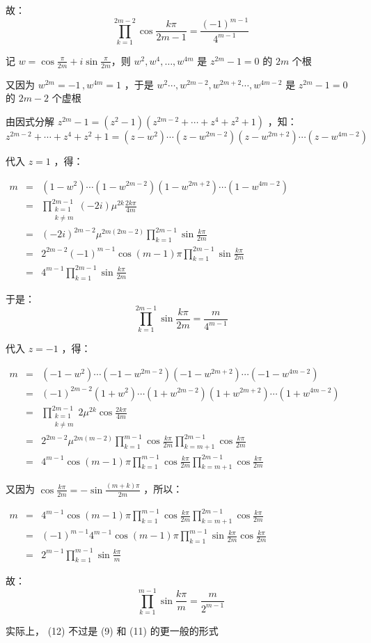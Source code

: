 故： \begin{equation}
\prod_{k=1}^{2m-2}\cos\frac{k\pi}{2m-1}=\frac{(-1)^{m-1}}{4^{m-1}}\tag{10} 
\end{equation}

记 $\displaystyle{w=\cos\frac{\pi}{2m}+i\sin\frac{\pi}{2m}}$，则 $w^2,w^4,\dots ,w^{4m}$ 是 $z^{2m}-1=0$ 的 $2m$ 个根

又因为 $w^{2m}=-1\,,w^{4m}=1$ ，于是 $w^2\cdots,w^{2m-2},w^{2m+2}\cdots,w^{4m-2}$ 是 $z^{2m}-1=0$ 的 $2m-2$ 个虚根

由因式分解 $z^{2m}-1=(z^2-1)(z^{2m-2}+\cdots+z^4+z^2+1)$ ，知：
$$z^{2m-2}+\cdots+z^4+z^2+1=(z-w^2)\cdots(z-w^{2m-2})(z-w^{2m+2})\cdots(z-w^{4m-2})$$

代入 $z=1$ ，得：

$\begin{eqnarray*} m&=&(1-w^2)\cdots(1-w^{2m-2})(1-w^{2m+2})\cdots(1-w^{4m-2})\\ &=&\prod_{\substack{k=1\\k\neq m}}^{2m-1}(-2i)\mu^{2k}\frac{2k\pi}{4m}\\ &=&(-2i)^{2m-2}\mu^{2m(2m-2)}\prod_{k=1}^{2m-1}\sin\frac{k\pi}{2m}\\ &=&2^{2m-2}(-1)^{m-1}\cos(m-1)\pi\prod_{k=1}^{2m-1}\sin\frac{k\pi}{2m}\\ &=&4^{m-1}\prod_{k=1}^{2m-1}\sin\frac{k\pi}{2m} \end{eqnarray*}$

于是： \begin{equation}
\prod_{k=1}^{2m-1}\sin\frac{k\pi}{2m}=\frac{m}{4^{m-1}}\tag{11} 
\end{equation}

代入 $z=-1$ ，得：

$\begin{eqnarray*} m&=&(-1-w^2)\cdots(-1-w^{2m-2})(-1-w^{2m+2})\cdots(-1-w^{4m-2})\\ &=&(-1)^{2m-2}(1+w^2)\cdots(1+w^{2m-2})(1+w^{2m+2})\cdots(1+w^{4m-2})\\ &=&\prod_{\substack{k=1\\k\neq m}}^{2m-1}2\mu^{2k}\cos\frac{2k\pi}{4m}\\ &=&2^{2m-2}\mu^{2m(m-2)}\prod_{k=1}^{m-1}\cos\frac{k\pi}{2m}\prod_{k=m+1}^{2m-1}\cos\frac{k\pi}{2m}\\ &=&4^{m-1}\cos(m-1)\pi\prod_{k=1}^{m-1}\cos\frac{k\pi}{2m}\prod_{k=m+1}^{2m-1}\cos\frac{k\pi}{2m}  \end{eqnarray*}$

又因为 $\displaystyle{\cos\frac{k\pi}{2m}=-\sin\frac{(m+k)\pi}{2m}}$ ，所以：

$\begin{eqnarray*} m&=&4^{m-1}\cos(m-1)\pi\prod_{k=1}^{m-1}\cos\frac{k\pi}{2m}\prod_{k=m+1}^{2m-1}\cos\frac{k\pi}{2m}\\ &=&(-1)^{m-1}4^{m-1}\cos(m-1)\pi\prod_{k=1}^{m-1}\sin\frac{k\pi}{2m}\cos\frac{k\pi}{2m}\\ &=&2^{m-1}\prod_{k=1}^{m-1}\sin\frac{k\pi}{m} \end{eqnarray*}$

故： \begin{equation}
\prod_{k=1}^{m-1}\sin\frac{k\pi}{m}=\frac{m}{2^{m-1}}\tag{12}
\end{equation}

实际上， (12) 不过是 (9) 和 (11) 的更一般的形式
